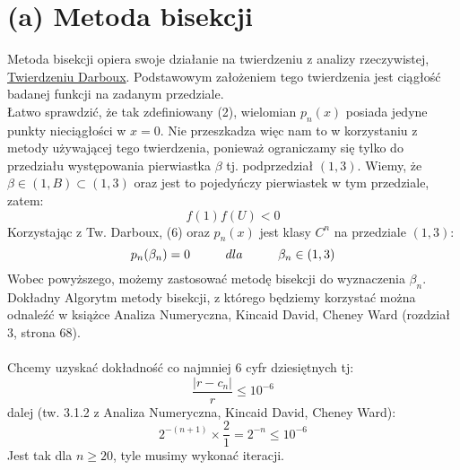 \documentclass{article}
\newcommand\tab[1][1cm]{\hspace*{#1}}
\begin{document}
\section{(a) Metoda bisekcji}
Metoda bisekcji opiera swoje działanie na twierdzeniu z analizy rzeczywistej, \href{https://pl.wikipedia.org/wiki/Twierdzenie_Darboux}{Twierdzeniu Darboux}. Podstawowym założeniem tego twierdzenia jest ciągłość badanej funkcji na zadanym przedziale.\\
Łatwo sprawdzić, że tak zdefiniowany (2), wielomian $p_n(x)$ posiada jedyne punkty nieciągłości w $x = 0$. Nie przeszkadza więc nam to w korzystaniu z metody używającej tego twierdzenia, ponieważ ograniczamy się tylko do przedziału występowania pierwiastka $\beta$ tj. podprzedział $(1,3)$.
\newline
Wiemy, że $\beta \in (1,B) \subset (1,3)$ oraz jest to pojedyńczy pierwiastek w tym przedziale, zatem:
\begin{equation}
f(1)f(U) < 0
\end{equation}
Korzystając z Tw. Darboux, (6) oraz $p_n(x)$ jest klasy $C^n$ na przedziale $(1,3)$:
$$
p_n(\beta_n) = 0 \tab dla \tab \beta_n \in (1,3)
$$
Wobec powyższego, możemy zastosować metodę bisekcji do wyznaczenia $\beta_n$.
Dokładny Algorytm metody bisekcji, z którego będziemy korzystać można odnaleźć w książce Analiza Numeryczna, Kincaid David, Cheney Ward (rozdział 3, strona 68).\\\\
Chcemy uzyskać dokładność co najmniej 6 cyfr dziesiętnych tj:
$$
\frac{|r-c_n|}{r} \leq 10^{-6}
$$
dalej (tw. 3.1.2 z Analiza Numeryczna, Kincaid David, Cheney Ward):
$$
2^{-(n+1)} \times \frac{2}{1} = 2^{-n} \leq 10^{-6}
$$
Jest tak dla $n \geq 20$, tyle musimy wykonać iteracji.
\end{document}
